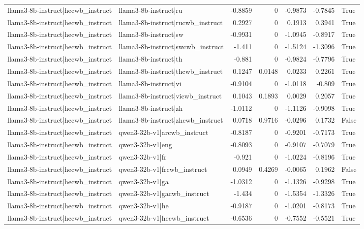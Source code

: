 \begin{table}
\begin{tabular}{l l r r r r l}
llama3-8b-instruct|hecwb_instruct & llama3-8b-instruct|ru & -0.8859 & 0 & -0.9873 & -0.7845 & True \\
llama3-8b-instruct|hecwb_instruct & llama3-8b-instruct|rucwb_instruct & 0.2927 & 0 & 0.1913 & 0.3941 & True \\
llama3-8b-instruct|hecwb_instruct & llama3-8b-instruct|sw & -0.9931 & 0 & -1.0945 & -0.8917 & True \\
llama3-8b-instruct|hecwb_instruct & llama3-8b-instruct|swcwb_instruct & -1.411 & 0 & -1.5124 & -1.3096 & True \\
llama3-8b-instruct|hecwb_instruct & llama3-8b-instruct|th & -0.881 & 0 & -0.9824 & -0.7796 & True \\
llama3-8b-instruct|hecwb_instruct & llama3-8b-instruct|thcwb_instruct & 0.1247 & 0.0148 & 0.0233 & 0.2261 & True \\
llama3-8b-instruct|hecwb_instruct & llama3-8b-instruct|vi & -0.9104 & 0 & -1.0118 & -0.809 & True \\
llama3-8b-instruct|hecwb_instruct & llama3-8b-instruct|vicwb_instruct & 0.1043 & 0.1893 & 0.0029 & 0.2057 & True \\
llama3-8b-instruct|hecwb_instruct & llama3-8b-instruct|zh & -1.0112 & 0 & -1.1126 & -0.9098 & True \\
llama3-8b-instruct|hecwb_instruct & llama3-8b-instruct|zhcwb_instruct & 0.0718 & 0.9716 & -0.0296 & 0.1732 & False \\
llama3-8b-instruct|hecwb_instruct & qwen3-32b-v1|arcwb_instruct & -0.8187 & 0 & -0.9201 & -0.7173 & True \\
llama3-8b-instruct|hecwb_instruct & qwen3-32b-v1|eng & -0.8093 & 0 & -0.9107 & -0.7079 & True \\
llama3-8b-instruct|hecwb_instruct & qwen3-32b-v1|fr & -0.921 & 0 & -1.0224 & -0.8196 & True \\
llama3-8b-instruct|hecwb_instruct & qwen3-32b-v1|frcwb_instruct & 0.0949 & 0.4269 & -0.0065 & 0.1962 & False \\
llama3-8b-instruct|hecwb_instruct & qwen3-32b-v1|ga & -1.0312 & 0 & -1.1326 & -0.9298 & True \\
llama3-8b-instruct|hecwb_instruct & qwen3-32b-v1|gacwb_instruct & -1.434 & 0 & -1.5354 & -1.3326 & True \\
llama3-8b-instruct|hecwb_instruct & qwen3-32b-v1|he & -0.9187 & 0 & -1.0201 & -0.8173 & True \\
llama3-8b-instruct|hecwb_instruct & qwen3-32b-v1|hecwb_instruct & -0.6536 & 0 & -0.7552 & -0.5521 & True \\

\end{tabular}
\end{table}
